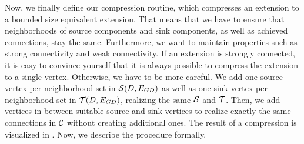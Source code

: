 \begin{theorem}
\begin{lemma}
\begin{theorem}
Now, we finally define our compression routine, which compresses an extension to a bounded size equivalent extension.
That means that we have to ensure that neighborhoods of source components and sink components, as well as achieved connections, stay the same. Furthermore, we want to maintain properties such as strong connectivity and weak connectivity. If an extension is strongly connected, it is easy to convince yourself that it is always possible to compress the extension to a single vertex. Otherwise, we have to be more careful. We add one source vertex per neighborhood set in $\operatorname{\mathcal{S}}({D,E_{{G}{D}}})$ as well as one sink vertex per neighborhood set in $\operatorname{\mathcal{T}}({D,E_{{G}{D}}})$, realizing the same $\operatorname{\mathcal{S}}$ and $\operatorname{\mathcal{T}}$. Then, we add vertices in between suitable source and sink vertices to realize exactly the same connections in $\operatorname{\mathcal{C}}$ without creating additional ones. 
The result of a compression is visualized in . Now, we describe the procedure formally. 




\end{theorem}
\end{lemma}
\end{theorem}
